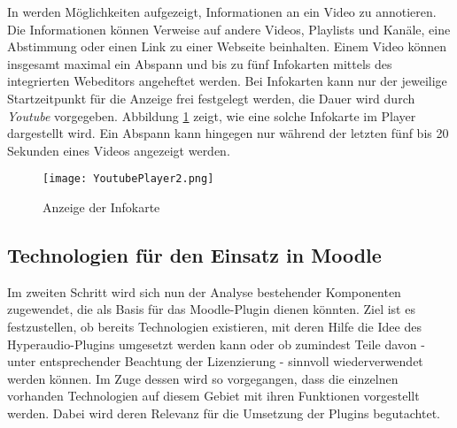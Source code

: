 In \citep{youtubeinfokarten,youtubeabspann} werden Möglichkeiten aufgezeigt, Informationen an ein Video zu annotieren. Die Informationen können Verweise auf andere Videos, Playlists und Kanäle, eine Abstimmung oder einen Link zu einer Webseite beinhalten. Einem Video können insgesamt maximal ein Abspann und bis zu fünf Infokarten mittels des integrierten Webeditors angeheftet werden. Bei Infokarten kann nur der jeweilige Startzeitpunkt für die Anzeige frei festgelegt werden, die Dauer wird durch \textit{Youtube} vorgegeben. Abbildung \ref{fig:YoutubePlayer2} zeigt, wie eine solche Infokarte im Player dargestellt wird. Ein Abspann kann hingegen nur während der letzten fünf bis 20 Sekunden eines Videos angezeigt werden.


\begin{figure}[h!]
\texttt{[image: YoutubePlayer2.png]}
\caption{\label{fig:YoutubePlayer2}Anzeige der Infokarte \citep{Youtube2015Panic}}
\end{figure}


\subsection{Technologien für den Einsatz in Moodle}
\label{sub:TechnologienMoodle}
Im zweiten Schritt wird sich nun der Analyse bestehender Komponenten zugewendet, die als Basis für das Moodle-Plugin dienen könnten. Ziel ist es festzustellen, ob bereits Technologien existieren, mit deren Hilfe die Idee des Hyperaudio-Plugins umgesetzt werden kann oder ob zumindest Teile davon - unter entsprechender Beachtung der Lizenzierung - sinnvoll wiederverwendet werden können. Im Zuge dessen wird so vorgegangen, dass die einzelnen vorhanden Technologien auf diesem Gebiet mit ihren Funktionen vorgestellt werden. Dabei wird deren Relevanz für die Umsetzung der Plugins begutachtet.

